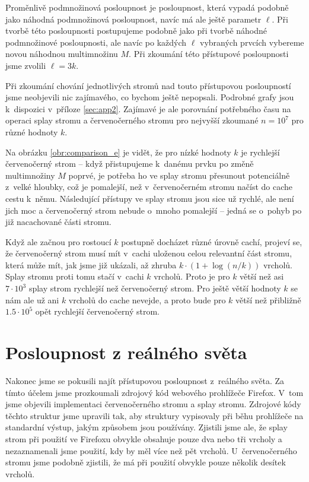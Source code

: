 Proměnlivě podmnožinová posloupnost je posloupnost, která vypadá podobně jako náhodná podmnožinová posloupnost, navíc má ale ještě parametr $\ell$. Při tvorbě této posloupnosti postupujeme podobně jako při tvorbě náhodné podmnožinové posloupnosti, ale navíc po každých $\ell$ vybraných prvcích vybereme novou náhodnou multimnožinu $M$. Při zkoumání této přístupové posloupnosti jsme zvolili $\ell = 3k$.


Při zkoumání chování jednotlivých stromů nad touto přístupovou posloupností jsme neobjevili nic zajímavého, co bychom ještě nepopsali. Podrobné grafy jsou k~dispozici v~příloze \ref{sec:app2}. Zajímavé je ale porovnání potřebného času na operaci splay stromu a červenočerného stromu pro nejvyšší zkoumané $n=10^7$ pro různé hodnoty $k$.

Na obrázku \ref{obr:comparison_e} je vidět, že pro nízké hodnoty $k$ je
rychlejší červenočerný strom -- když přistupujeme k~danému prvku po změně
multimnožiny $M$ poprvé, je potřeba ho ve splay stromu přesunout potenciálně
z~velké hloubky, což je pomalejší, než v~červenočerném stromu načíst do cache
cestu k~němu. Následující přístupy ve splay stromu jsou sice už rychlé, ale
není jich moc a červenočerný strom nebude o~mnoho pomalejší -- jedná se
o~pohyb po již nacachované části stromu. 

Když ale začnou pro rostoucí $k$
postupně docházet různé úrovně cachí, projeví se, že  červenočerný strom musí mít v~cachi uloženou celou relevantní část stromu, která může mít, jak jsme již ukázali, až zhruba $k \cdot (1+\log(n/k))$ vrcholů. Splay stromu proti tomu stačí v~cachi $k$ vrcholů. Proto je pro $k$ větší než asi $7\cdot10^3$ splay strom rychlejší než červenočerný strom. Pro ještě větší hodnoty $k$ se nám ale už ani $k$ vrcholů do cache nevejde, a proto bude pro $k$ větší než přibližně $1.5\cdot 10^5$ opět rychlejší červenočerný strom.

\section{Posloupnost z reálného světa}


Nakonec jsme se pokusili najít přístupovou posloupnost z~reálného světa. Za tímto účelem jsme prozkoumali zdrojový kód webového prohlížeče Firefox. V~tom jsme objevili implementaci červenočerného stromu a splay stromu. Zdrojové kódy těchto struktur jsme upravili tak, aby struktury vypisovaly při běhu prohlížeče na standardní výstup, jakým způsobem jsou používány. Zjistili jsme ale, že splay strom při použití ve Firefoxu obvykle obsahuje pouze dva nebo tři vrcholy a nezaznamenali jsme použití, kdy by měl více než pět vrcholů. U~červenočerného stromu jsme podobně zjistili, že má při použití obvykle pouze několik desítek vrcholů.

